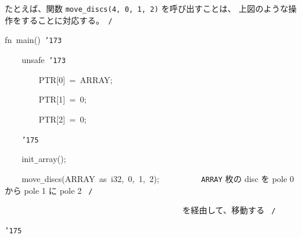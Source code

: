 \documentclass[a4paper,10pt]{article}
\def\mc{\relax}
\begin{document}
たとえば、関数 {\tt move\_discs(4, 0, 1, 2)} を呼び出すことは、
上図のような操作をすることに対応する。\hfill \rm\mc \ {\tt *}{\tt /}
\tt\mc 

\noindent
\mbox{}\hfill

\noindent
\mbox{}\hfill

\noindent
\mbox{}fn{\tt\mc \ }main(){\tt\mc \ }{\tt\char'173}

\noindent
\mbox{}{\tt\mc \ }{\tt\mc \ }{\tt\mc \ }{\tt\mc \ }unsafe{\tt\mc \ }{\tt\char'173}

\noindent
\mbox{}{\tt\mc \ }{\tt\mc \ }{\tt\mc \ }{\tt\mc \ }{\tt\mc \ }{\tt\mc \ }{\tt\mc \ }{\tt\mc \ }PTR[0]{\tt\mc \ }={\tt\mc \ }ARRAY;

\noindent
\mbox{}{\tt\mc \ }{\tt\mc \ }{\tt\mc \ }{\tt\mc \ }{\tt\mc \ }{\tt\mc \ }{\tt\mc \ }{\tt\mc \ }PTR[1]{\tt\mc \ }={\tt\mc \ }0;

\noindent
\mbox{}{\tt\mc \ }{\tt\mc \ }{\tt\mc \ }{\tt\mc \ }{\tt\mc \ }{\tt\mc \ }{\tt\mc \ }{\tt\mc \ }PTR[2]{\tt\mc \ }={\tt\mc \ }0;

\noindent
\mbox{}{\tt\mc \ }{\tt\mc \ }{\tt\mc \ }{\tt\mc \ }{\tt\char'175}

\noindent
\mbox{}\hfill

\noindent
\mbox{}{\tt\mc \ }{\tt\mc \ }{\tt\mc \ }{\tt\mc \ }init{\tt\_}array();

\noindent
\mbox{}{\tt\mc \ }{\tt\mc \ }{\tt\mc \ }{\tt\mc \ }move{\tt\_}discs(ARRAY{\tt\mc \ }as{\tt\mc \ }i32,{\tt\mc \ }0,{\tt\mc \ }1,{\tt\mc \ }2);{\tt\mc \ \ \ \ \ \ \ \ }\rm\mc {\tt /}{\tt *}\  \ {\tt ARRAY} 枚の disc を
					   pole 0 から pole 1 に pole 2
					   \hfill \rm\mc \ {\tt *}{\tt /}
\tt\mc 

\noindent
\mbox{}{\tt\mc \ \ \ \ \ \ \ \ }{\tt\mc \ \ \ \ \ \ \ \ }{\tt\mc \ \ \ \ \ \ \ \ }{\tt\mc \ \ \ \ \ \ \ \ }{\tt\mc \ \ \ \ \ \ \ \ }\rm\mc {\tt /}{\tt *}\  \ を経由して、移動する \hfill \rm\mc \ {\tt *}{\tt /}
\tt\mc 

\noindent
\mbox{}{\tt\char'175}

\rm\mc
\end{document}
